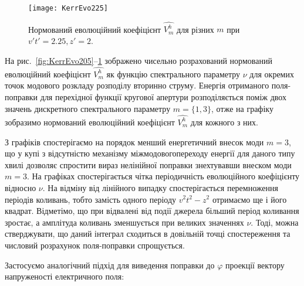 \begin{figure}[htbp] \begin{center}
\texttt{[image: KerrEvo225]}
\caption{Нормований еволюційний коефіцієнт $ \hat{V_m^h} $ для 
різних $ m $ при $ v't' = 2.25, z' = 2 $.} 
\label{fig:KerrEvo225}
\end{center} \end{figure}

На рис.~\ref{fig:KerrEvo205}--\ref{fig:KerrEvo225} зображено чисельно 
розрахований нормований еволюційний коефіцієнт $ \hat{V_m^h} $ як функцію 
спектрального параметру $ \nu $ для окремих точок модового розкладу розподілу 
вторинно струму. Енергія отриманого поля-поправки для перехідної функції 
кругової апертури розподіляється поміж двох значень дискретного спектрального 
параметру $ m = \{ 1, 3\} $, отже на графіку зобразимо нормований еволюційний 
коефіцієнт $ \hat{V_m^h} $ для кожного з них.

З графіків спостерігаємо на порядок менший енергетичний внесок моди $ m = 3 $, 
що у купі з відсутністю механізму міжмодовогопереходу енергії для даного типу 
хвилі дозволяє спростити вираз нелінійної поправки знехтувавши внеском моди 
$ m = 3 $. На графіках спостерігається чітка періодичність еволюційного 
коефіцієнту відносно $ \nu $. На відміну від лінійного випадку спостерігається 
перемноження періодів коливань, тобто замість одного періоду $ v^2t^2 - z^2 $ 
отримаємо ще і його квадрат. Відметімо, що при відвалені від події джерела 
більший період коливання зростає, а амплітуда коливань зменшується при 
великих значеннях $ \nu $. Тоді, можна стверджувати, що даний інтеграл 
сходиться в довільній точці спостереження та числовий розрахунок 
поля-поправки спрощується.

Застосуємо аналогічний підхід для виведення поправки до $ \varphi $ проекції 
вектору напруженості електричного поля:



